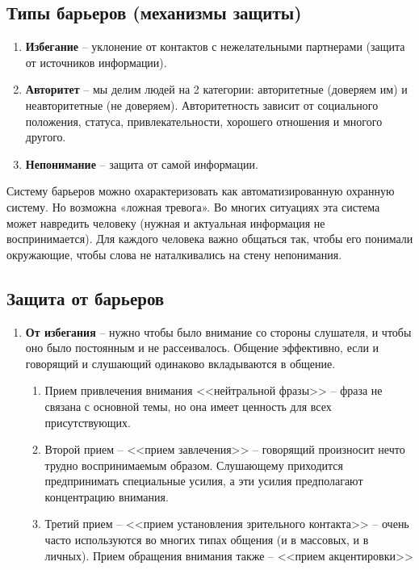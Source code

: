 \subsection{Типы барьеров (механизмы защиты)}

\begin{enumerate}
    \item \textbf{Избегание} -- уклонение от контактов с
        нежелательными партнерами (защита от источников информации).
    \item \textbf{Авторитет} -- мы делим людей на 2 категории:
        авторитетные (доверяем им) и неавторитетные (не доверяем).
        Авторитетность зависит от социального положения, статуса,
        привлекательности, хорошего отношения и многого другого.
    \item \textbf{Непонимание} -- защита от самой информации.
\end{enumerate}

Систему барьеров можно охарактеризовать как автоматизированную
охранную систему. Но возможна «ложная тревога». Во многих
ситуациях эта система может навредить человеку (нужная и
актуальная информация не воспринимается). Для каждого человека
важно общаться так, чтобы его понимали окружающие, чтобы слова
не наталкивались на стену непонимания.

\subsection{Защита от барьеров}

\begin{enumerate}
    \item \textbf{От избегания} -- нужно чтобы было внимание со
        стороны слушателя, и чтобы оно было постоянным и не
        рассеивалось. Общение эффективно, если и говорящий и
        слушающий одинаково вкладываются в общение.

        \begin{enumerate}
            \item Прием привлечения внимания <<нейтральной фразы>> --
                фраза не связана с основной темы, но она имеет
                ценность для всех присутствующих.
            \item Второй прием -- <<прием завлечения>> -- говорящий
                произносит нечто трудно воспринимаемым образом.
                Слушающему приходится предпринимать специальные
                усилия, а эти усилия предполагают концентрацию внимания.
            \item Третий прием -- <<прием установления зрительного
                контакта>> -- очень часто используются во многих
                типах общения (и в массовых, и в личных). Прием
                обращения внимания также -- <<прием акцентировки>>
        \end{enumerate}
\end{enumerate}


